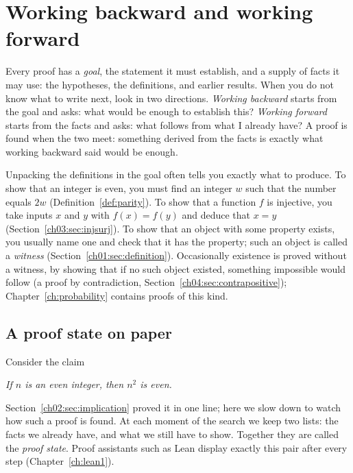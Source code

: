 \section{Working backward and working forward}\label{ch04:sec:directions}
Every proof has a \emph{goal}, the statement it must establish, and a supply of facts it may use: the hypotheses, the definitions, and earlier results. When you do not know what to write next, look in two directions. \emph{Working backward} starts from the goal and asks: what would be enough to establish this? \emph{Working forward} starts from the facts and asks: what follows from what I already have? A proof is found when the two meet: something derived from the facts is exactly what working backward said would be enough.

Unpacking the definitions in the goal often tells you exactly what to produce. To show that an integer is even, you must find an integer $w$ such that the number equals $2w$ (Definition~\ref{def:parity}). To show that a function $f$ is injective, you take inputs $x$ and $y$ with $f(x)=f(y)$ and deduce that $x=y$ (Section~\ref{ch03:sec:injsurj}). To show that an object with some property exists, you usually name one and check that it has the property; such an object is called a \emph{witness} (Section~\ref{ch01:sec:definition}). Occasionally existence is proved without a witness, by showing that if no such object existed, something impossible would follow (a proof by contradiction, Section~\ref{ch04:sec:contrapositive}); Chapter~\ref{ch:probability} contains proofs of this kind.

\subsection*{A proof state on paper}
Consider the claim
\begin{center}
\emph{If $n$ is an even integer, then $n^2$ is even.}
\end{center}
Section~\ref{ch02:sec:implication} proved it in one line; here we slow down to watch how such a proof is found. At each moment of the search we keep two lists: the facts we already have, and what we still have to show. Together they are called the \emph{proof state}. Proof assistants such as Lean display exactly this pair after every step (Chapter~\ref{ch:lean1}).

